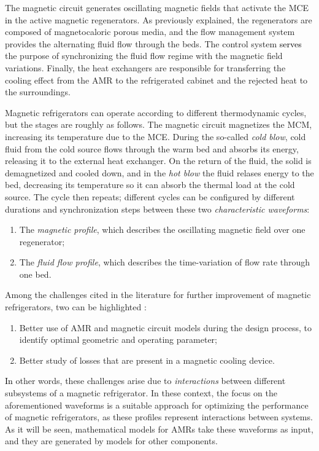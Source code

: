 \documentclass[referee]{svjour3}
\begin{document}
The magnetic circuit generates oscillating magnetic fields that activate the MCE \textcolor{black}{in} the active magnetic regenerators. As previously explained, the regenerators are composed of magnetocaloric porous media, and the flow management system provides the alternating fluid flow through the beds. The control system \textcolor{black}{serves} the purpose of synchronizing the fluid flow regime with the magnetic field variations. Finally, the heat exchangers are responsible for transferring the cooling effect from the AMR to the refrigerated cabinet and the rejected heat to the surroundings. 

Magnetic refrigerators can operate according to different thermodynamic cycles, but the stages are roughly as follows. The magnetic circuit magnetizes the MCM, increasing its temperature due to the MCE. During the so-called \emph{cold blow}, cold fluid from the cold source flows through the warm bed and absorbs its energy, releasing it to the external heat exchanger. On the return of the fluid, the solid is demagnetized and cooled down, and in the \emph{hot blow} the fluid relases energy to the bed, decreasing its temperature so it can absorb the thermal load at the cold source. The cycle then repeats; different cycles can be configured by different durations and synchronization steps between these two \emph{characteristic waveforms}:

\begin{enumerate}
\item The \emph{magnetic profile}, which describes the oscillating magnetic field over one regenerator;
\item The \emph{fluid flow profile}, which describes the time-variation of flow rate through one bed.
\end{enumerate}

Among the challenges cited in the literature for further improvement of magnetic refrigerators, two can be highlighted \cite{bib:eriksen16_activ}:

\begin{enumerate}
\item Better use of AMR and magnetic circuit models during the design process, to identify optimal geometric and operating parameter;
\item Better study of losses that are present in a magnetic cooling device.
\end{enumerate}

\textcolor{black}{In} other words, these challenges arise due to \emph{interactions} between different subsystems \textcolor{black}of a magnetic refrigerator. In these context, the focus on the aforementioned waveforms is a suitable approach for optimizing the performance of magnetic refrigerators, as these profiles represent interactions between systems. As it will be seen, mathematical models for AMRs take these waveforms as input, and they are generated by models for other components.
\end{document}
